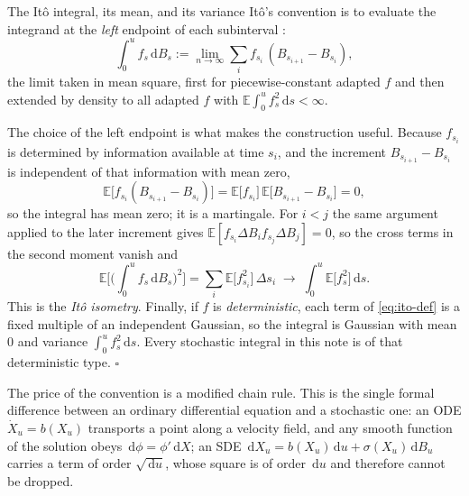 \documentclass[11pt,a4paper]{article}
\newcommand{\E}{\mathbb{E}}
\newcommand{\dd}{\,\mathrm d}
\newcounter{toolbox}
\begin{document}
\begin{toolbox}{The It\^o integral, its mean, and its variance}\label{tb:ito-integral}
It\^o's convention is to evaluate the integrand at the \emph{left} endpoint of each
subinterval \citep{ito1944stochastic}:
\begin{equation}
 \int_0^u f_s\dd B_s
 :=\lim_{n\to\infty}\sum_{i}f_{s_i}\,(B_{s_{i+1}}-B_{s_i}),
 \label{eq:ito-def}
\end{equation}
the limit taken in mean square, first for piecewise-constant adapted $f$ and then extended by
density to all adapted $f$ with $\E\int_0^uf_s^2\dd s<\infty$.

The choice of the left endpoint is what makes the construction useful. Because $f_{s_i}$ is
determined by information available at time $s_i$, and the increment $B_{s_{i+1}}-B_{s_i}$ is
independent of that information with mean zero,
\begin{equation}
 \E\big[f_{s_i}(B_{s_{i+1}}-B_{s_i})\big]
 =\E\big[f_{s_i}\big]\,\E\big[B_{s_{i+1}}-B_{s_i}\big]=0 ,
 \label{eq:ito-mean}
\end{equation}
so the integral has mean zero; it is a martingale. For $i<j$ the same argument applied to the
later increment gives $\E[f_{s_i}\Delta B_i f_{s_j}\Delta B_j]=0$, so the cross terms in the
second moment vanish and
\begin{equation}
 \E\Big[\Big(\int_0^u f_s\dd B_s\Big)^2\Big]
 =\sum_i\E\big[f_{s_i}^2\big]\,\Delta s_i
 \;\longrightarrow\;
 \int_0^u\E\big[f_s^2\big]\dd s .
 \label{eq:ito-isometry}
\end{equation}
This is the \emph{It\^o isometry}. Finally, if $f$ is \emph{deterministic}, each term of
\eqref{eq:ito-def} is a fixed multiple of an independent Gaussian, so the integral is Gaussian
with mean $0$ and variance $\int_0^uf_s^2\dd s$. Every stochastic integral in this note is of
that deterministic type. \hfill$\square$
\end{toolbox}

The price of the convention is a modified chain rule. This is the single formal difference
between an ordinary differential equation and a stochastic one: an ODE
$\dot X_u=b(X_u)$ transports a point along a velocity field, and any smooth function of the
solution obeys $\dd\phi=\phi'\dd X$; an SDE
$\dd X_u=b(X_u)\dd u+\sigma(X_u)\dd B_u$ carries a term of order $\sqrt{\dd u}$, whose square
is of order $\dd u$ and therefore cannot be dropped.
\end{document}
